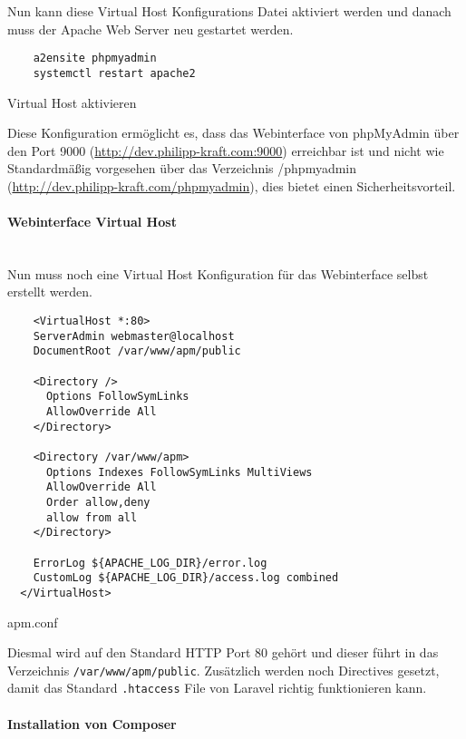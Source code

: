 Nun kann diese Virtual Host Konfigurations Datei aktiviert werden und danach
muss der Apache Web Server neu gestartet werden.

\begin{listing}[H]
  \begin{verbatim}
    a2ensite phpmyadmin
    systemctl restart apache2
  \end{verbatim}
  \caption{Virtual Host aktivieren}
\end{listing}

Diese Konfiguration ermöglicht es, dass das Webinterface von phpMyAdmin über den
Port 9000 (\url{http://dev.philipp-kraft.com:9000}) erreichbar ist und nicht wie
Standardmäßig vorgesehen über das Verzeichnis /phpmyadmin
(\url{http://dev.philipp-kraft.com/phpmyadmin}), dies bietet einen
Sicherheitsvorteil.

\paragraph{Webinterface Virtual Host}\mbox{}\\

Nun muss noch eine Virtual Host Konfiguration für das Webinterface selbst
erstellt werden.

\begin{listing}[H]
  \begin{verbatim}
    <VirtualHost *:80>
    ServerAdmin webmaster@localhost
    DocumentRoot /var/www/apm/public
          
    <Directory />
      Options FollowSymLinks
      AllowOverride All
    </Directory>
  
    <Directory /var/www/apm>
      Options Indexes FollowSymLinks MultiViews
      AllowOverride All
      Order allow,deny
      allow from all
    </Directory>
  
    ErrorLog ${APACHE_LOG_DIR}/error.log
    CustomLog ${APACHE_LOG_DIR}/access.log combined
  </VirtualHost>
  \end{verbatim}
  \caption{apm.conf}
\end{listing}

Diesmal wird auf den Standard HTTP Port 80 gehört und dieser führt in das
Verzeichnis \verb|/var/www/apm/public|. Zusätzlich werden noch Directives
gesetzt, damit das Standard \verb|.htaccess| File von Laravel richtig
funktionieren kann.

\paragraph{Installation von Composer}\mbox{}\\

